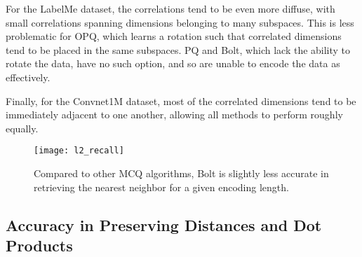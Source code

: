 For the LabelMe dataset, the correlations tend to be even more diffuse, with small correlations spanning dimensions belonging to many subspaces. This is less problematic for OPQ, which learns a rotation such that correlated dimensions tend to be placed in the same subspaces. PQ and Bolt, which lack the ability to rotate the data, have no such option, and so are unable to encode the data as effectively.

Finally, for the Convnet1M dataset, most of the correlated dimensions tend to be immediately adjacent to one another, allowing all methods to perform roughly equally.


\begin{figure}[h]
\begin{center}
\texttt{[image: l2\_recall]}
\caption{Compared to other MCQ algorithms, Bolt is slightly less accurate in retrieving the nearest neighbor for a given encoding length.}
\label{fig:nn_acc}
\end{center}
\end{figure}





\subsection{Accuracy in Preserving Distances and Dot Products}


